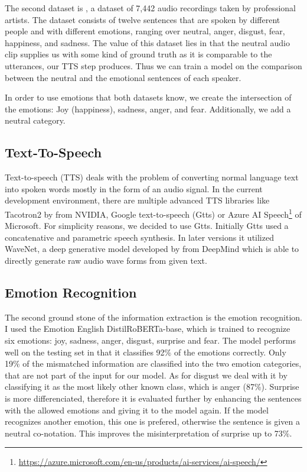 \documentclass[11pt]{article}
\begin{document}
The second dataset is \cite{cao_data}, a dataset of 7,442 audio recordings taken by professional artists. The dataset consists of twelve sentences that are spoken by different people and with different emotions, ranging over neutral, anger, disgust, fear, happiness, and sadness. The value of this dataset lies in that the neutral audio clip supplies us with some kind of ground truth as it is comparable to the utterances, our TTS step produces. Thus we can train a model on the comparison between the neutral and the emotional sentences of each speaker.

In order to use emotions that both datasets know, we create the intersection of the emotions: Joy (happiness), sadness, anger, and fear. Additionally, we add a neutral category.
\subsection{Text-To-Speech}
Text-to-speech (TTS) deals with the problem of converting normal language text into spoken words mostly in the form of an audio signal. 
In the current development environment, there are multiple advanced TTS libraries like Tacotron2 by \cite{shen_natural_2018} from NVIDIA, Google text-to-speech (Gtts) \cite{gtts} or Azure AI Speech\footnote{\url{https://azure.microsoft.com/en-us/products/ai-services/ai-speech/}} of Microsoft. For simplicity reasons, we decided to use Gtts. Initially Gtts used a concatenative and parametric speech synthesis. In later versions it utilized WaveNet, a deep generative model developed by \citeauthor{van2016wavenet} from DeepMind which is able to directly generate raw audio wave forms from given text.

\subsection{Emotion Recognition}

The second ground stone of the information extraction is the emotion recognition. I used the Emotion English DistilRoBERTa-base\cite{hartmann2022emotionenglish}, which is trained to recognize six emotions: joy, sadness, anger, disgust, surprise and fear. The model performs well on the testing set in that it classifies 92\% of the emotions correctly. Only 19\% of the mismatched information are classified into the two emotion categories, that are not part of the input for our model. As for disgust we deal with it by classifying it as the most likely other known class, which is anger (87\%). Surprise is more differenciated, therefore it is evaluated further by enhancing the sentences with the allowed emotions and giving it to the model again. If the model recognizes another emotion, this one is prefered, otherwise the sentence is given a neutral co-notation. This improves the misinterpretation of surprise up to 73\%.
\end{document}
